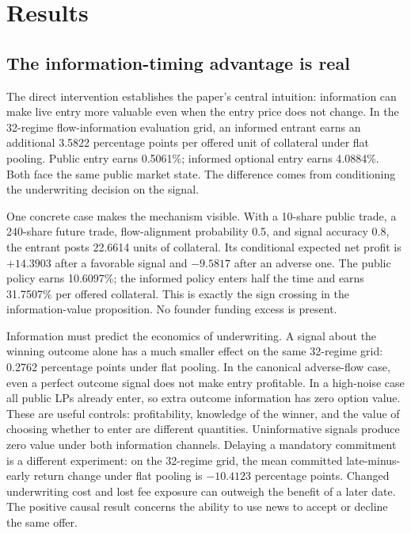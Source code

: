 \documentclass[10pt]{article}
\begin{document}
\section{Results}

\subsection{The information-timing advantage is real}

The direct intervention establishes the paper's central intuition: information can make live entry more valuable even when the entry price does not change. In the 32-regime flow-information evaluation grid, an informed entrant earns an additional 3.5822 percentage points per offered unit of collateral under flat pooling. Public entry earns 0.5061\%; informed optional entry earns 4.0884\%. Both face the same public market state. The difference comes from conditioning the underwriting decision on the signal.

One concrete case makes the mechanism visible. With a 10-share public trade, a 240-share future trade, flow-alignment probability 0.5, and signal accuracy 0.8, the entrant posts 22.6614 units of collateral. Its conditional expected net profit is $+14.3903$ after a favorable signal and $-9.5817$ after an adverse one. The public policy earns 10.6097\%; the informed policy enters half the time and earns 31.7507\% per offered collateral. This is exactly the sign crossing in the information-value proposition. No founder funding excess is present.

Information must predict the economics of underwriting. A signal about the winning outcome alone has a much smaller effect on the same 32-regime grid: 0.2762 percentage points under flat pooling. In the canonical adverse-flow case, even a perfect outcome signal does not make entry profitable. In a high-noise case all public LPs already enter, so extra outcome information has zero option value. These are useful controls: profitability, knowledge of the winner, and the value of choosing whether to enter are different quantities. Uninformative signals produce zero value under both information channels. Delaying a mandatory commitment is a different experiment: on the 32-regime grid, the mean committed late-minus-early return change under flat pooling is $-10.4123$ percentage points. Changed underwriting cost and lost fee exposure can outweigh the benefit of a later date. The positive causal result concerns the ability to use news to accept or decline the same offer.
\end{document}
